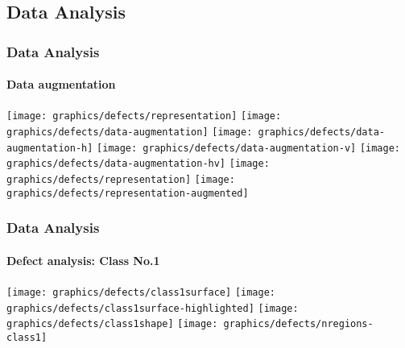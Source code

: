\subsection{Data Analysis}

    \begin{frame}
        \frametitle{Data Analysis}
        \framesubtitle{Data augmentation}
        \centering
         {
            \texttt{[image: graphics/defects/representation]}
        }
         {
            \texttt{[image: graphics/defects/data-augmentation]}
        }
         {
            \texttt{[image: graphics/defects/data-augmentation-h]}
        }
         {
            \texttt{[image: graphics/defects/data-augmentation-v]}
        }
         {
            \texttt{[image: graphics/defects/data-augmentation-hv]}
        }
         {
            \texttt{[image: graphics/defects/representation]}
        }
         {
            \texttt{[image: graphics/defects/representation-augmented]}
        }
    \end{frame}

    \begin{frame}
        \frametitle{Data Analysis}
        \framesubtitle{Defect analysis: Class No.1}
         {
            \texttt{[image: graphics/defects/class1surface]}
        }
         {
            \texttt{[image: graphics/defects/class1surface-highlighted]}
        }
         {
            \texttt{[image: graphics/defects/class1shape]}
        }
         {
            \texttt{[image: graphics/defects/nregions-class1]}
        }
    \end{frame}


